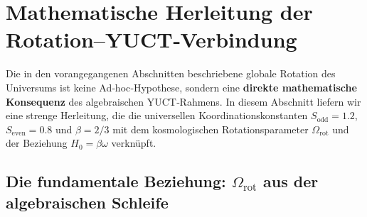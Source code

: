 \documentclass[11pt,a4paper]{article}
\begin{document}
	\section{Mathematische Herleitung der Rotation–YUCT‑Verbindung}
	\label{sec:rotation-yuct}
	
	Die in den vorangegangenen Abschnitten beschriebene globale Rotation des Universums ist keine Ad‑hoc‑Hypothese, sondern eine \textbf{direkte mathematische Konsequenz} des algebraischen YUCT‑Rahmens. In diesem Abschnitt liefern wir eine strenge Herleitung, die die universellen Koordinationskonstanten \(S_{\mathrm{odd}}=1.2\), \(S_{\mathrm{even}}=0.8\) und \(\beta = 2/3\) mit dem kosmologischen Rotationsparameter \(\Omega_{\mathrm{rot}}\) und der Beziehung \(H_0 = \beta\omega\) verknüpft.
	
	\subsection{Die fundamentale Beziehung: \(\Omega_{\mathrm{rot}}\) aus der algebraischen Schleife}
	
\end{document}
